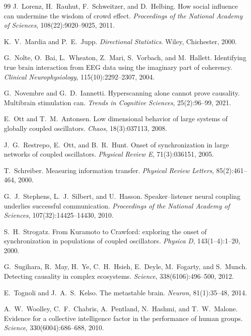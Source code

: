 \documentclass[11pt]{article}
\begin{document}
\begin{thebibliography}{99}
J.~Lorenz, H.~Rauhut, F.~Schweitzer, and D.~Helbing.
\newblock How social influence can undermine the wisdom of crowd effect.
\newblock \emph{Proceedings of the National Academy of Sciences}, 108(22):9020--9025, 2011.

K.~V.~Mardia and P.~E.~Jupp.
\newblock \emph{Directional Statistics}.
\newblock Wiley, Chichester, 2000.

G.~Nolte, O.~Bai, L.~Wheaton, Z.~Mari, S.~Vorbach, and M.~Hallett.
\newblock Identifying true brain interaction from EEG data using the imaginary part of coherency.
\newblock \emph{Clinical Neurophysiology}, 115(10):2292--2307, 2004.

G.~Novembre and G.~D.~Iannetti.
\newblock Hyperscanning alone cannot prove causality. Multibrain stimulation can.
\newblock \emph{Trends in Cognitive Sciences}, 25(2):96--99, 2021.

E.~Ott and T.~M.~Antonsen.
\newblock Low dimensional behavior of large systems of globally coupled oscillators.
\newblock \emph{Chaos}, 18(3):037113, 2008.

J.~G.~Restrepo, E.~Ott, and B.~R.~Hunt.
\newblock Onset of synchronization in large networks of coupled oscillators.
\newblock \emph{Physical Review E}, 71(3):036151, 2005.

T.~Schreiber.
\newblock Measuring information transfer.
\newblock \emph{Physical Review Letters}, 85(2):461--464, 2000.

G.~J.~Stephens, L.~J.~Silbert, and U.~Hasson.
\newblock Speaker--listener neural coupling underlies successful communication.
\newblock \emph{Proceedings of the National Academy of Sciences}, 107(32):14425--14430, 2010.

S.~H.~Strogatz.
\newblock From Kuramoto to Crawford: exploring the onset of synchronization in populations of coupled oscillators.
\newblock \emph{Physica D}, 143(1--4):1--20, 2000.

G.~Sugihara, R.~May, H.~Ye, C.~H.~Hsieh, E.~Deyle, M.~Fogarty, and S.~Munch.
\newblock Detecting causality in complex ecosystems.
\newblock \emph{Science}, 338(6106):496--500, 2012.

E.~Tognoli and J.~A.~S.~Kelso.
\newblock The metastable brain.
\newblock \emph{Neuron}, 81(1):35--48, 2014.

A.~W.~Woolley, C.~F.~Chabris, A.~Pentland, N.~Hashmi, and T.~W.~Malone.
\newblock Evidence for a collective intelligence factor in the performance of human groups.
\newblock \emph{Science}, 330(6004):686--688, 2010.

\end{thebibliography}
\end{document}

